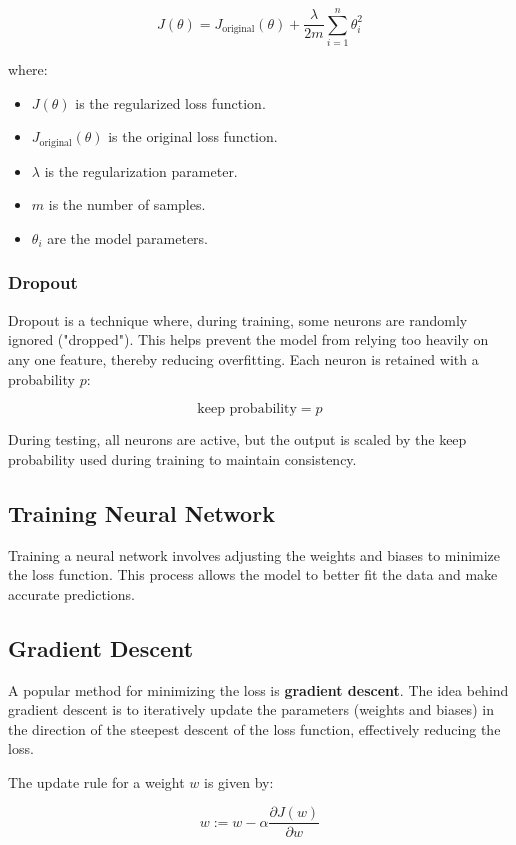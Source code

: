 \documentclass{article}
\begin{document}
\[
J(\theta) = J_{\text{original}}(\theta) + \frac{\lambda}{2m} \sum_{i=1}^{n} \theta_i^2
\]

where:
\begin{itemize}
    \item \( J(\theta) \) is the regularized loss function.
    \item \( J_{\text{original}}(\theta) \) is the original loss function.
    \item \( \lambda \) is the regularization parameter.
    \item \( m \) is the number of samples.
    \item \( \theta_i \) are the model parameters.
\end{itemize}

\subsubsection*{Dropout}
Dropout is a technique where, during training, some neurons are randomly ignored ("dropped"). This helps prevent the model from relying too heavily on any one feature, thereby reducing overfitting. Each neuron is retained with a probability \( p \):

\[
\text{keep probability} = p
\]

During testing, all neurons are active, but the output is scaled by the keep probability used during training to maintain consistency.




\subsection{Training Neural Network}

Training a neural network involves adjusting the weights and biases to minimize the loss function. This process allows the model to better fit the data and make accurate predictions.

\subsection*{Gradient Descent}
A popular method for minimizing the loss is \textbf{gradient descent}. The idea behind gradient descent is to iteratively update the parameters (weights and biases) in the direction of the steepest descent of the loss function, effectively reducing the loss.

The update rule for a weight \( w \) is given by:

\[
w := w - \alpha \frac{\partial J(w)}{\partial w}
\]
\end{document}
